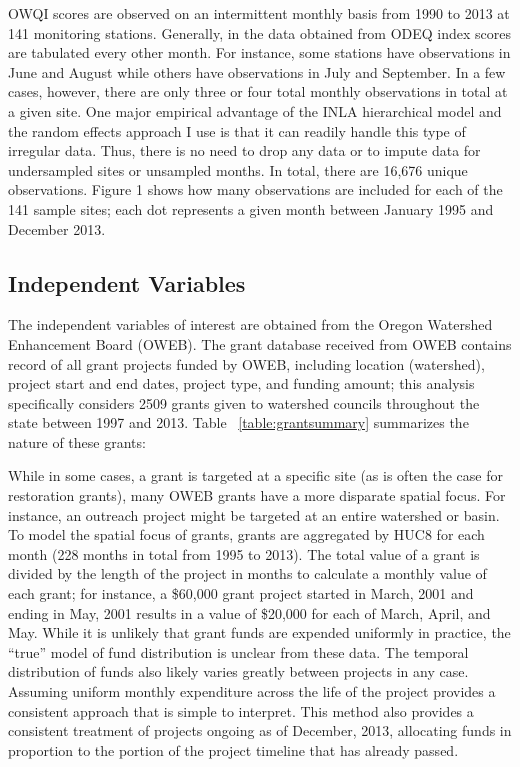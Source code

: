 \documentclass[11pt,a4paper,titlepage]{article}
\begin{document}
OWQI scores are observed on an intermittent monthly basis from 1990 to 2013 at 141 monitoring stations. Generally, in the data obtained from ODEQ index scores are tabulated every other month. For instance, some stations have observations in June and August while others have observations in July and September. In a few cases, however, there are only three or four total monthly observations in total at a given site. One major empirical advantage of the INLA hierarchical model and the random effects approach I use is that it can readily handle this type of irregular data. Thus, there is no need to drop any data or to impute data for undersampled sites or unsampled months. In total, there are 16,676 unique observations. Figure 1 shows how many observations are included for each of the 141 sample sites; each dot represents a given month between January 1995 and December 2013. 

\subsection*{Independent Variables}

The independent variables of interest are obtained from the Oregon Watershed Enhancement Board (OWEB). The grant database received from OWEB contains record of all grant projects funded by OWEB, including location (watershed), project start and end dates, project type, and funding amount; this analysis specifically considers 2509 grants given to watershed councils throughout the state between 1997 and 2013. Table ~\ref{table:grantsummary} summarizes the nature of these grants:



While in some cases, a grant is targeted at a specific site (as is often the case for restoration grants), many OWEB grants have a more disparate spatial focus. For instance, an outreach project might be targeted at an entire watershed or basin. To model the spatial focus of grants, grants are aggregated by HUC8 for each month (228 months in total from 1995 to 2013). The total value of a grant is divided by the length of the project in months to calculate a monthly value of each grant; for instance, a \$60,000 grant project started in March, 2001 and ending in May, 2001 results in a value of \$20,000 for each of March, April, and May. While it is unlikely that grant funds are expended uniformly in practice, the “true” model of fund distribution is unclear from these data. The temporal distribution of funds also likely varies greatly between projects in any case. Assuming uniform monthly expenditure across the life of the project provides a consistent approach that is simple to interpret. This method also provides a consistent treatment of projects ongoing as of December, 2013, allocating funds in proportion to the portion of the project timeline that has already passed. 
\end{document}
